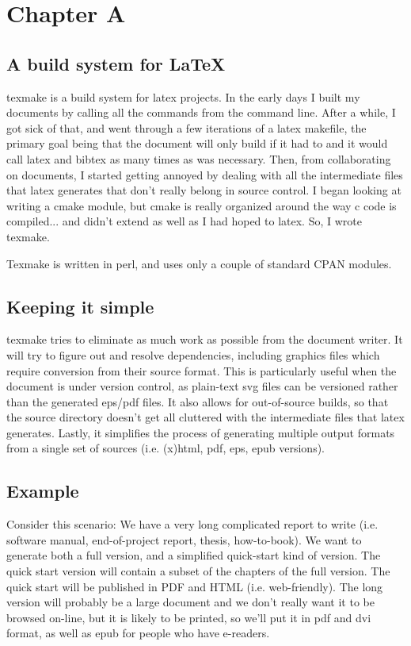 \chapter{Chapter A}

\section{A build system for LaTeX}

texmake is a build system for latex projects. 
%
In the early days I built my documents by calling all the commands from the command line.
%
After a while, I got sick of that, and went through a few iterations of a latex makefile, the primary goal being that the document will only build if it had to and it would call latex and bibtex as many times as was necessary. 
%
Then, from collaborating on documents, I started getting annoyed by dealing with all the intermediate files that latex generates that don't really belong in source control. 
%
I began looking at writing a cmake module, but cmake is really organized around the way c code is compiled... and didn't extend as well as I had hoped to latex. 
%
So, I wrote texmake.

Texmake is written in perl, and uses only a couple of standard CPAN modules.

\section{Keeping it simple}

texmake tries to eliminate as much work as possible from the document writer.
%
It will try to figure out and resolve dependencies, including graphics files which require conversion from their source format. 
%
This is particularly useful when the document is under version control, as plain-text svg files can be versioned rather than the generated eps/pdf files. 
%
It also allows for out-of-source builds, so that the source directory doesn't get all cluttered with the intermediate files that latex generates. 
%
Lastly, it simplifies the process of generating multiple output formats from a single set of sources (i.e. (x)html, pdf, eps, epub versions). 

\section{Example}

Consider this scenario: We have a very long complicated report to write (i.e. software manual, end-of-project report, thesis, how-to-book). 
%
We want to generate both a full version, and a simplified quick-start kind of version. 
%
The quick start version will contain a subset of the chapters of the full version. 
%
The quick start will be published in PDF and HTML (i.e. web-friendly). 
%
The long version will probably be a large document and we don't really want it to be browsed on-line, but it is likely to be printed, so we'll put it in pdf and dvi format, as well as epub for people who have e-readers.


